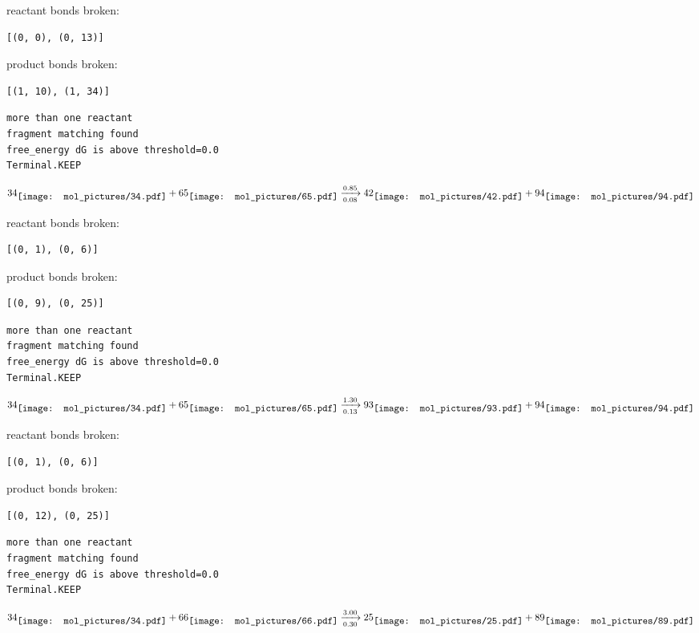 \documentclass{article}
\begin{document}
reactant bonds broken:\begin{verbatim}
[(0, 0), (0, 13)]
\end{verbatim}
product bonds broken:\begin{verbatim}
[(1, 10), (1, 34)]
\end{verbatim}




\vspace{1cm}
\begin{verbatim}
more than one reactant
fragment matching found
free_energy dG is above threshold=0.0
Terminal.KEEP
\end{verbatim}
$$
34
\raisebox{-.5\height}{\texttt{[image: mol\_pictures/34.pdf]}}
+
65
\raisebox{-.5\height}{\texttt{[image: mol\_pictures/65.pdf]}}
\xrightarrow[0.08]{0.85}
42
\raisebox{-.5\height}{\texttt{[image: mol\_pictures/42.pdf]}}
+
94
\raisebox{-.5\height}{\texttt{[image: mol\_pictures/94.pdf]}}
$$


reactant bonds broken:\begin{verbatim}
[(0, 1), (0, 6)]
\end{verbatim}
product bonds broken:\begin{verbatim}
[(0, 9), (0, 25)]
\end{verbatim}




\vspace{1cm}
\begin{verbatim}
more than one reactant
fragment matching found
free_energy dG is above threshold=0.0
Terminal.KEEP
\end{verbatim}
$$
34
\raisebox{-.5\height}{\texttt{[image: mol\_pictures/34.pdf]}}
+
65
\raisebox{-.5\height}{\texttt{[image: mol\_pictures/65.pdf]}}
\xrightarrow[0.13]{1.30}
93
\raisebox{-.5\height}{\texttt{[image: mol\_pictures/93.pdf]}}
+
94
\raisebox{-.5\height}{\texttt{[image: mol\_pictures/94.pdf]}}
$$


reactant bonds broken:\begin{verbatim}
[(0, 1), (0, 6)]
\end{verbatim}
product bonds broken:\begin{verbatim}
[(0, 12), (0, 25)]
\end{verbatim}




\vspace{1cm}
\begin{verbatim}
more than one reactant
fragment matching found
free_energy dG is above threshold=0.0
Terminal.KEEP
\end{verbatim}
$$
34
\raisebox{-.5\height}{\texttt{[image: mol\_pictures/34.pdf]}}
+
66
\raisebox{-.5\height}{\texttt{[image: mol\_pictures/66.pdf]}}
\xrightarrow[0.30]{3.00}
25
\raisebox{-.5\height}{\texttt{[image: mol\_pictures/25.pdf]}}
+
89
\raisebox{-.5\height}{\texttt{[image: mol\_pictures/89.pdf]}}
$$
\end{document}
